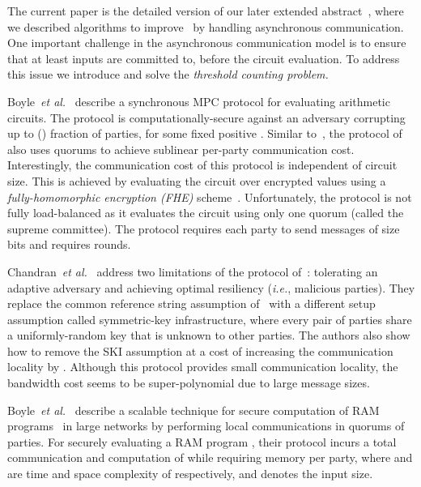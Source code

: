 \documentclass[11pt,letter]{article}
\newcommand{\ie}{\emph{i.e.}}
\newcommand{\etal}{\emph{et al.}}
\theoremstyle{mytheoremstyle}
\begin{document}
\begin{description}
	The current paper is the detailed version of our later extended abstract~\cite{DKMS-ICDCN-2014}, where we described algorithms to improve~\cite{Dani:2012:BAB:2332432.2332473} by handling asynchronous communication. One important challenge in the asynchronous communication model is to ensure that at least  inputs are committed to, before the circuit evaluation. To address this issue we introduce and solve the \emph{threshold counting problem.}
	
	Boyle~\etal~\cite{Boyle:2013:CLS:2450206.2450227} describe a synchronous MPC protocol for evaluating arithmetic circuits. The protocol is computationally-secure against an adversary corrupting up to () fraction of parties, for some fixed positive . Similar to~\cite{Dani:2012:BAB:2332432.2332473}, the protocol of~\cite{Boyle:2013:CLS:2450206.2450227} also uses quorums to achieve sublinear per-party communication cost. Interestingly, the communication cost of this protocol is independent of circuit size. This is achieved by evaluating the circuit over encrypted values using a \emph{fully-homomorphic encryption (FHE)} scheme~\cite{Gentry:2009:FHE:1536414.1536440}. Unfortunately, the protocol is not fully load-balanced as it evaluates the circuit using only one quorum (called the supreme committee). The protocol requires each party to send  messages of size  bits and requires  rounds.
	
	Chandran~\etal~\cite{cryptoeprint:2014:615} address two limitations of the protocol of~\cite{Boyle:2013:CLS:2450206.2450227}: tolerating an adaptive adversary and achieving optimal resiliency (\ie,  malicious parties). They replace the common reference string assumption of~\cite{Boyle:2013:CLS:2450206.2450227} with a different setup assumption called symmetric-key infrastructure, where every pair of parties share a uniformly-random key that is unknown to other parties. The authors also show how to remove the SKI assumption at a cost of increasing the communication locality by . Although this protocol provides small communication locality, the bandwidth cost seems to be super-polynomial due to large message sizes.
	


Boyle~\etal~\cite{cryptoeprint:2014:404} describe a scalable technique for secure computation of RAM programs~\cite{Goldreich:1996:SPS:233551.233553} in large networks by performing local communications in quorums of parties. For securely evaluating a RAM program , their protocol incurs a total communication and computation of  while requiring  memory per party, where  and  are time and space complexity of  respectively, and  denotes the input size.
	

\end{description}
\end{document}
